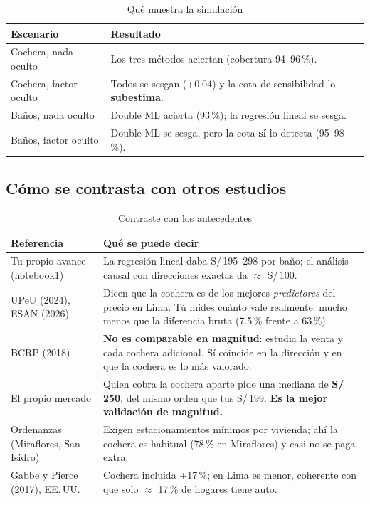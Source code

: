 \documentclass[11pt,a4paper]{article}
\begin{document}
\begin{table}[H]\small
\caption{Qué muestra la simulación}
\begin{tabularx}{\textwidth}{>{\raggedright\arraybackslash}p{3.6cm}L}
\toprule
Escenario & Resultado \\
\midrule
Cochera, nada oculto & Los tres métodos aciertan (cobertura 94--96\,\%). \\
Cochera, factor oculto & Todos se sesgan ($+0.04$) y la cota de sensibilidad lo \textbf{subestima}. \\
Baños, nada oculto & Double ML acierta (93\,\%); la regresión lineal se sesga. \\
Baños, factor oculto & Double ML se sesga, pero la cota \textbf{sí} lo detecta (95--98\,\%). \\
\bottomrule
\end{tabularx}
\end{table}

\subsection{Cómo se contrasta con otros estudios}

\begin{table}[H]\small
\caption{Contraste con los antecedentes}
\begin{tabularx}{\textwidth}{>{\raggedright\arraybackslash}p{4cm}L}
\toprule
Referencia & Qué se puede decir \\
\midrule
Tu propio avance (notebook1) & La regresión lineal daba S/\,195--298 por baño; el análisis causal con direcciones exactas da $\approx$ S/\,100. \\
UPeU (2024), ESAN (2026) & Dicen que la cochera es de los mejores \emph{predictores} del precio en Lima. Tú mides cuánto vale realmente: mucho menos que la diferencia bruta (7.5\,\% frente a 63\,\%). \\
BCRP (2018) & \textbf{No es comparable en magnitud}: estudia la venta y cada cochera adicional. Sí coincide en la dirección y en que la cochera es lo más valorado. \\
El propio mercado & Quien cobra la cochera aparte pide una mediana de \textbf{S/\,250}, del mismo orden que tus S/\,199. \textbf{Es la mejor validación de magnitud.} \\
Ordenanzas (Miraflores, San Isidro) & Exigen estacionamientos mínimos por vivienda; ahí la cochera es habitual (78\,\% en Miraflores) y casi no se paga extra. \\
Gabbe y Pierce (2017), EE.\,UU. & Cochera incluida +17\,\%; en Lima es menor, coherente con que solo $\approx$ 17\,\% de hogares tiene auto. \\
\bottomrule
\end{tabularx}
\end{table}
\end{document}
